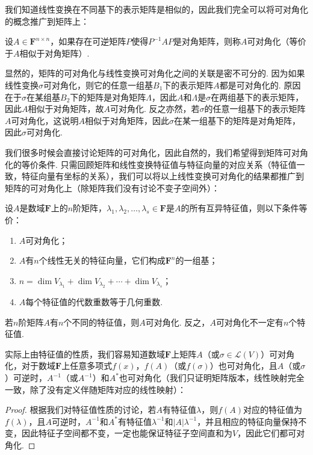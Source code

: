 我们知道线性变换在不同基下的表示矩阵是相似的，因此我们完全可以将可对角化的概念推广到矩阵上：
\begin{definition}{}{}
    设$A\in\mathbf{F}^{n\times n}$，如果存在可逆矩阵$P$使得$P^{-1}AP$是对角矩阵，则称$A$可对角化（等价于$A$相似于对角矩阵）.
\end{definition}
显然的，矩阵的可对角化与线性变换可对角化之间的关联是密不可分的. 因为如果线性变换$\sigma$可对角化，则它的任意一组基$B_1$下的表示矩阵$A$都是可对角化的. 原因在于$\sigma$在某组基$B_2$下的矩阵是对角矩阵$\varLambda$，因此$A$和$\varLambda$是$\sigma$在两组基下的表示矩阵，因此$A$相似于对角矩阵，故$A$可对角化. 反之亦然，若$\sigma$的任意一组基下的表示矩阵$A$可对角化，这说明$A$相似于对角矩阵，因此$\sigma$在某一组基下的矩阵是对角矩阵，因此$\sigma$可对角化.

我们很多时候会直接讨论矩阵的可对角化，因此自然的，我们希望得到矩阵可对角化的等价条件. 只需回顾矩阵和线性变换特征值与特征向量的对应关系（特征值一致，特征向量有坐标的关系），我们可以将以上线性变换可对角化的结果都推广到矩阵的可对角化上（除矩阵我们没有讨论不变子空间外）：
\begin{theorem}{}{}
    设$A$是数域$\mathbf{F}$上的$n$阶矩阵，$\lambda_1,\lambda_2,\ldots,\lambda_s\in\mathbf{F}$是$A$的所有互异特征值，则以下条件等价：
    \begin{enumerate}
        \item $A$可对角化；
        \item $A$有$n$个线性无关的特征向量，它们构成$\mathbf{F}^n$的一组基；
        \item $n=\dim V_{\lambda_1}+\dim V_{\lambda_2}+\cdots+\dim V_{\lambda_s}$；
        \item $A$每个特征值的代数重数等于几何重数.
    \end{enumerate}
\end{theorem}

\begin{corollary}{}{}
    若$n$阶矩阵$A$有$n$个不同的特征值，则$A$可对角化. 反之，$A$可对角化不一定有$n$个特征值.
\end{corollary}

实际上由特征值的性质，我们容易知道数域$\mathbf{F}$上矩阵$A$（或$\sigma\in\mathcal{L}(V)$）可对角化，对于数域$\mathbf{F}$上任意多项式$f(x)$，$f(A)$（或$f(\sigma)$）也可对角化，且$A$（或$\sigma$）可逆时，$A^{-1}$（或$A^{-1}$）和$A^*$也可对角化（我们只证明矩阵版本，线性映射完全一致，除了没有定义伴随矩阵对应的线性映射）：

\begin{proof}
    根据我们对特征值性质的讨论，若$A$有特征值$\lambda$，则$f(A)$对应的特征值为$f(\lambda)$，且$A$可逆时，$A^{-1}$和$A^*$有特征值$\lambda^{-1}$和$|A|\lambda^{-1}$，并且相应的特征向量保持不变，因此特征子空间都不变，一定也能保证特征子空间直和为$V$，因此它们都可对角化.
\end{proof}

